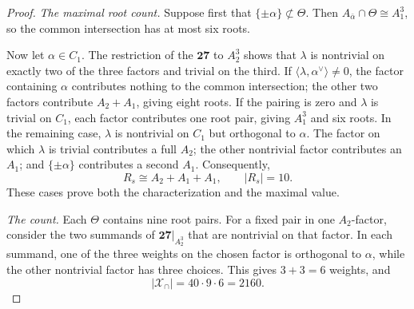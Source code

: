 \documentclass[11pt]{article}
\theoremstyle{remark}
\begin{document}
\begin{proof}
\emph{The maximal root count.} Suppose first that \(\{\pm\alpha\}\not\subset\Theta\). Then
\(A_{\bar\alpha}\cap\Theta\cong A_1^3\), so the common intersection
has at most six roots.

Now let \(\alpha\in C_1\). The restriction of the \(\mathbf{27}\) to
\(A_2^3\) shows that \(\lambda\) is nontrivial on exactly two of the
three factors and trivial on the third. If
\(\langle\lambda,\alpha^\vee\rangle\ne0\), the factor containing
\(\alpha\) contributes nothing to the common intersection; the other two
factors contribute \(A_2+A_1\), giving eight roots. If the pairing is zero
and \(\lambda\) is trivial on \(C_1\), each factor contributes one root
pair, giving \(A_1^3\) and six roots. In the remaining case, \(\lambda\)
is nontrivial on \(C_1\) but orthogonal to \(\alpha\). The factor on which
\(\lambda\) is trivial contributes a full \(A_2\); the other nontrivial
factor contributes an \(A_1\); and \(\{\pm\alpha\}\) contributes a second
\(A_1\). Consequently,
\[
 R_s\cong A_2+A_1+A_1,
 \qquad |R_s|=10.
\]
These cases prove both the characterization and the maximal value.

\emph{The count.} Each \(\Theta\) contains nine root pairs. For a fixed pair in one
\(A_2\)-factor, consider the two summands of
\(\mathbf{27}|_{A_2^3}\) that are nontrivial on that factor. In each
summand, one of the three weights on the chosen factor is orthogonal to
\(\alpha\), while the other nontrivial factor has three choices. This gives
\(3+3=6\) weights, and
\[
 |\mathcal X_{\cap}|=40\cdot9\cdot6=2160.
\]


\end{proof}
\end{document}
